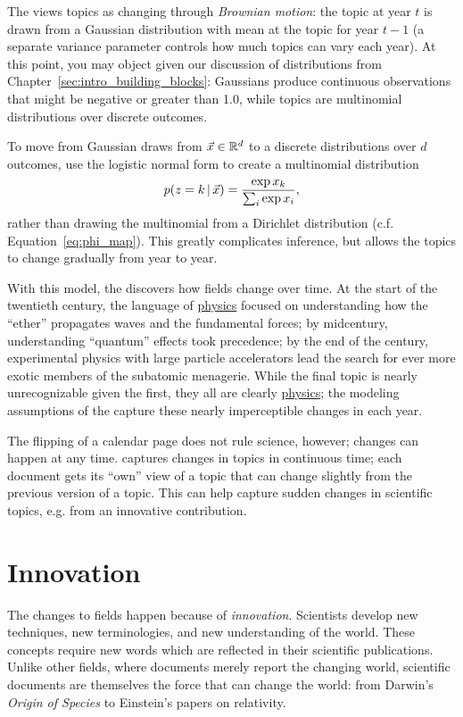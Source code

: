 The  views topics as changing through \emph{Brownian
  motion}: the topic at year $t$ is drawn from a Gaussian distribution
with mean at the topic for year $t-1$ (a separate variance parameter
controls how much topics can vary each year).  At this point, you may
object given our discussion of distributions from
Chapter~\ref{sec:intro_building_blocks}: Gaussians produce continuous
observations that might be negative or greater than 1.0, while topics are multinomial distributions over discrete outcomes.

To move from Gaussian draws from $\vec x \in \mathbb{R}^d$ to a discrete distributions
over $d$ outcomes, \citet{blei-06b} use the logistic normal form to
create a multinomial distribution
\begin{equation}
p(z=k \, | \, \vec x)  = \frac{\exp{x_k}}{\sum_i \exp{x_i}},
\end{equation}
rather than drawing the multinomial from a Dirichlet distribution
(c.f. Equation~\ref{eq:phi_map}).
This greatly complicates inference, but allows the topics to change
gradually from year to year.

With this model, the  discovers how fields change over
time.  At the start of the twentieth century, the language of
\underline{physics} focused on understanding how the ``ether''
propagates waves and the fundamental forces; by midcentury,
understanding ``quantum'' effects took precedence; by the end of the
century, experimental physics with large particle accelerators lead
the search for ever more exotic members of the subatomic menagerie.
While the final topic is nearly unrecognizable given the first, they
all are clearly \underline{physics}; the modeling assumptions of the
 capture these nearly imperceptible changes in each year.

The flipping of a calendar page does not rule science, however;
changes can happen at any time.  \citet{wang-08} captures changes in
topics in continuous time; each document gets its ``own'' view of a
topic that can change slightly from the previous version of a topic.
This can help capture sudden changes in scientific topics, e.g. from
an innovative contribution.


\section{Innovation}

The changes to fields happen because of \emph{innovation}.  Scientists develop
new techniques, new terminologies, and new understanding of the world.  These
concepts require new words which are reflected in their scientific
publications.  Unlike other fields, where documents merely report the changing
world, scientific documents are themselves the force that can change the world:
from Darwin's \textit{Origin of Species} to Einstein's papers on relativity.

